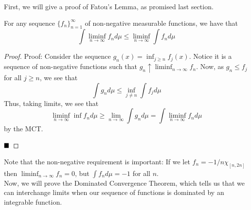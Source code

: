 
First, we will give a proof of Fatou's Lemma, as promised last section.

\begin{theorem}
    For any sequence $\{f_n\}_{n = 1}^{\infty}$ of non-negative measurable functions, we have that
    \[ \int \liminf_{n \to \infty} f_n d\mu \leq \liminf_{n \to \infty} \int f_n d\mu \]
\end{theorem}
\begin{proof}{Proof:}
    Consider the sequence $g_n(x) = \inf_{j \geq n} f_{j}(x)$. Notice it is a sequence of non-negative functions such that $g_{n} \uparrow \liminf_{n \to \infty} f_n$. Now, as $g_n \leq f_{j}$ for all $j \geq n$, we see that
    \[ \int g_n d\mu \leq \inf_{j \neq n} \int f_{j}d\mu \]
    Thus, taking limits, we see that
    \[ \liminf_{n \to \infty} \inf f_{n}d\mu \geq \lim_{n \to \infty} \int g_n d\mu = \int \liminf_{n \to \infty} f_n d\mu \]
    by the MCT.

    $\qed$
\end{proof}

Note that the non-negative requirement is important: If we let $f_n =- 1/n\chi_{[n, 2n]}$ then $\liminf_{n \to \infty} f_n = 0$, but $\int f_nd\mu = -1$ for all $n$.\\

Now, we will prove the Dominated Convergence Theorem, which tells us that we can interchange limits when our sequence of functions is dominated by an integrable function.

